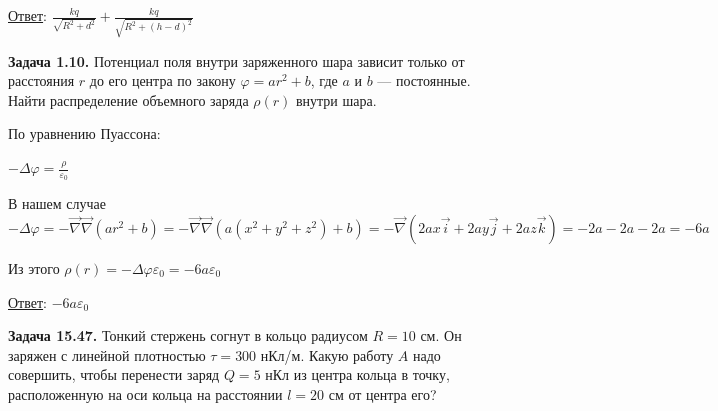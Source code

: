 \documentclass[12pt]{article}
\begin{document}
\bigvspace

\underline{Ответ}: $\frac{kq}{\sqrt{R^2 + d^2}} + \frac{kq}{\sqrt{R^2 + (h - d)^2}}$

\begin{tcolorbox}
    \textbf{Задача 1.10.} Потенциал поля внутри заряженного шара зависит только от
    расстояния $r$ до его центра по закону $\varphi = ar^2 + b$, где $a$ и $b$ — постоянные. 
    Найти распределение объемного заряда $\rho(r)$ внутри
    шара.
\end{tcolorbox}

\begin{minipage}{\textwidth}
    \begin{figure}
    \end{figure}

    По уравнению Пуассона:

    $-\Delta \varphi = \frac{\rho}{\varepsilon_0}$

    В нашем случае $-\Delta \varphi = -\vec\nabla\vec\nabla(ar^2 + b) = -\vec\nabla\vec\nabla(a(x^2 + y^2 + z^2) + b) = 
    -\vec\nabla\left(2ax\vec{i} + 2ay\vec{j} + 2az\vec{k}\right) = -2a - 2a - 2a = -6a$

    Из этого $\rho(r) = -\Delta \varphi \varepsilon_0 = -6a\varepsilon_0$
\end{minipage}

\bigvspace

\underline{Ответ}: $-6a\varepsilon_0$


\begin{tcolorbox}
    \textbf{Задача 15.47.} Тонкий стержень согнут в кольцо радиусом $R = 10$ см.
    Он заряжен с линейной плотностью $\tau = 300$ нКл/м. Какую работу
    $A$ надо совершить, чтобы перенести заряд $Q = 5$ нКл из центра кольца в точку,
    расположенную на оси кольца на расстоянии $l = 20$ см от центра его?
\end{tcolorbox}
\end{document}
